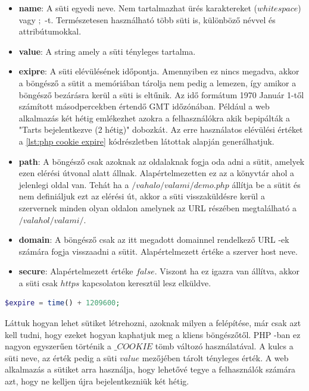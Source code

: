 \documentclass[12pt]{report}
\theoremstyle{definition}
\begin{document}
	\begin{itemize}
		\item\textbf{name}: A süti egyedi neve. Nem tartalmazhat ürés karaktereket ($whitespace$) vagy $;$ -t. Természetesen használható több süti is, különböző névvel és attribútumokkal.
		\item\textbf{value}: A string amely a süti tényleges tartalma.
		\item\textbf{exipre}: A süti elévülésének időpontja. Amennyiben ez nincs megadva, akkor a böngésző a sütit a memóriában tárolja nem pedig a lemezen, így amikor a böngésző bezárásra kerül a süti is eltűnik. Az idő formátum 1970 Január 1-től számított másodpercekben értendő GMT időzónában. Például a web alkalmazás két hétig emlékezhet azokra a felhasználókra akik bepipálták a "Tarts bejelentkezve (2 hétig)" dobozkát. Az erre használatos elévülési értéket a \ref{lst:php cookie expire} kódrészletben látottak alapján generálhatjuk.
		\item\textbf{path}: A böngésző csak azoknak az oldalaknak fogja oda adni a sütit, amelyek ezen elérési útvonal alatt állnak. Alapértelmezetten ez az a könyvtár ahol a jelenlegi oldal van. Tehát ha a $/vahalo/valami/demo.php$ állítja be a sütit és nem definiáljuk ezt az elérési út, akkor a süti visszaküldésre kerül a szervernek minden olyan oldalon amelynek az URL részében megtalálható a $/valahol/valami/$.
		\item\textbf{domain}: A böngésző csak az itt megadott domainnel rendelkező URL -ek számára fogja visszaadni a sütit. Alapértelmezett értéke a szerver host neve.
		\item\textbf{secure}: Alapértelmezett értéke $false$. Viszont ha ez igazra van állítva, akkor a süti csak $https$ kapcsolaton keresztül lesz elküldve.
	\end{itemize}
	
	\noindent\begin{minipage}{\linewidth}
		\begin{lstlisting}[language=php,label={lst:php cookie expire}, caption={PHP cookie expire generálása 2 hét múlvára}]
$expire = time() + 1209600;
		\end{lstlisting}
	\end{minipage}
	
	Láttuk hogyan lehet sütiket létrehozni, azoknak milyen a felépítése, már csak azt kell tudni, hogy ezeket hogyan kaphatjuk meg a kliens böngészőtől. PHP -ban ez nagyon egyszerűen történik a $\_COOKIE$ tömb változó használatával. A kulcs a süti neve, az érték pedig a süti $value$ mezőjében tárolt tényleges érték. A web alkalmazás a sütiket arra használja, hogy lehetővé tegye a felhasználók számára azt, hogy ne kelljen újra bejelentkezniük két hétig. 
	
\end{document}
